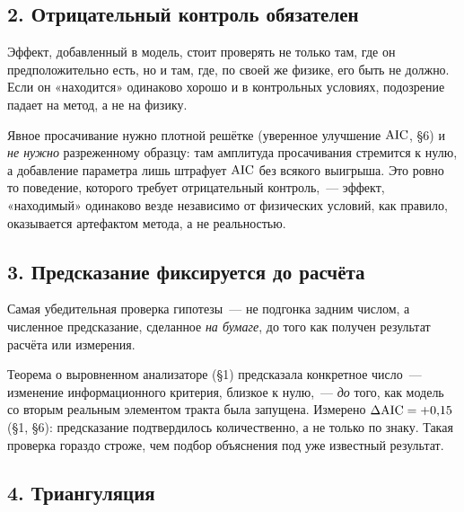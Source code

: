 \subsection{2. Отрицательный контроль обязателен}
\label{subsec:rule2}

Эффект, добавленный в модель, стоит проверять не только там, где он предположительно есть, но и
там, где, по своей же физике, его быть не должно. Если он «находится» одинаково хорошо
и в контрольных условиях, подозрение падает на метод, а не на физику.

\begin{example}
Явное просачивание нужно плотной решётке (уверенное улучшение $\operatorname{AIC}$, §6) и \emph{не нужно}
разреженному образцу: там амплитуда просачивания стремится к нулю, а добавление параметра лишь
штрафует $\operatorname{AIC}$ без всякого выигрыша. Это ровно то поведение, которого требует отрицательный
контроль,~--- эффект, «находимый» одинаково везде независимо от физических условий, как правило,
оказывается артефактом метода, а не реальностью.
\end{example}

\subsection{3. Предсказание фиксируется до расчёта}
\label{subsec:rule3}

Самая убедительная проверка гипотезы~--- не подгонка задним числом, а численное предсказание,
сделанное \emph{на бумаге}, до того как получен результат расчёта или измерения.

\begin{example}
Теорема о выровненном анализаторе (§1) предсказала конкретное число~--- изменение информационного
критерия, близкое к нулю,~--- \emph{до} того, как модель со вторым реальным элементом тракта была
запущена. Измерено $\Delta\mathrm{AIC}=+0{,}15$ (§1, §6): предсказание подтвердилось количественно, а не
только по знаку. Такая проверка гораздо строже, чем подбор объяснения под уже известный результат.
\end{example}

\subsection{4. Триангуляция}
\label{subsec:rule4}

